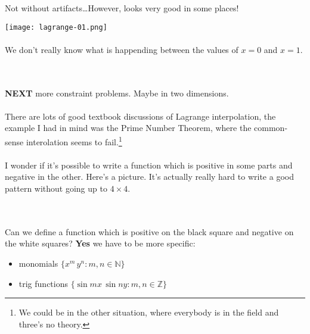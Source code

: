 \documentclass[12pt]{article}
\newcommand{\sq}[3]{\draw[#3] (#1,#2)--(#1+1,#2)--(#1+1,#2+1)--(#1,#2+1)--cycle;}
\begin{document}
\newpage

\noindent Not without artifacts\dots However, looks very good in some places!

\texttt{[image: lagrange-01.png]} \\ \\
We don't really know what is happending between the values of $x = 0$ and $x = 1$.  \\
 \\ \\
\textbf{NEXT} more constraint problems.  Maybe in two dimensions. \\ \\
There are lots of good textbook discussions of Lagrange interpolation, the example I had in mind was the Prime Number Theorem, where the common-sense interolation seems to fail.\footnote{We could be in the other situation, where everybody is in the field and three's no theory.}  \\ \\
I wonder if it's possible to write a function which is positive in some parts and negative in the other.  Here's a picture.  It's actually really hard to write a good pattern without going up to $4 \times 4$.   \\ \\
 \\
Can we define a function which is positive on the black square and negative on the white squares? \textbf{Yes} we have to be more specific:
\begin{itemize}
\item monomials $\{ x^m \, y^n : m, n \in \mathbb{N} \}$
\item trig functions $\{ \sin m x \, \sin n y : m, n \in \mathbb{Z}  \}$ 
\end{itemize}  
\end{document}
